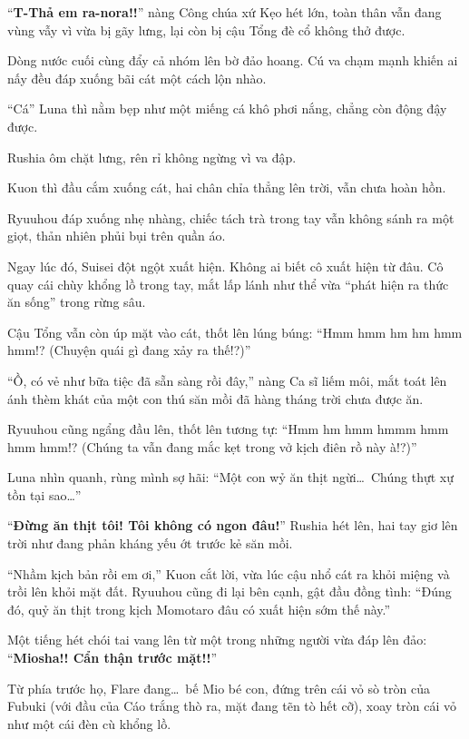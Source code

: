 \documentclass[../main.tex]{subfiles}
\begin{document}
``\textbf{T-Thả em ra-nora!!}'' nàng Công chúa xứ Kẹo hét lớn, toàn thân vẫn đang vùng vẫy vì vừa bị gãy lưng, lại còn bị cậu Tổng đè cổ không thở được.

Dòng nước cuối cùng đẩy cả nhóm lên bờ đảo hoang. Cú va chạm mạnh khiến ai nấy đều đáp xuống bãi cát một cách lộn nhào.

``Cá'' Luna thì nằm bẹp như một miếng cá khô phơi nắng, chẳng còn động đậy được.

Rushia ôm chặt lưng, rên rỉ không ngừng vì va đập.

Kuon thì đầu cắm xuống cát, hai chân chỉa thẳng lên trời, vẫn chưa hoàn hồn.

Ryuuhou đáp xuống nhẹ nhàng, chiếc tách trà trong tay vẫn không sánh ra một giọt, thản nhiên phủi bụi trên quần áo.


Ngay lúc đó, Suisei đột ngột xuất hiện. Không ai biết cô xuất hiện từ đâu. Cô quay cái chùy khổng lồ trong tay, mắt lấp lánh như thể vừa ``phát hiện ra thức ăn sống'' trong rừng sâu.

Cậu Tổng vẫn còn úp mặt vào cát, thốt lên lúng búng: ``Hmm hmm hm hm hmm hmm!? (Chuyện quái gì đang xảy ra thế!?)''

``Ồ, có vẻ như bữa tiệc đã sẵn sàng rồi đây,'' nàng Ca sĩ liếm môi, mắt toát lên ánh thèm khát của một con thú săn mồi đã hàng tháng trời chưa được ăn.

Ryuuhou cũng ngẩng đầu lên, thốt lên tương tự: ``Hmm hm hmm hmmm hmm hmm hmm!? (Chúng ta vẫn đang mắc kẹt trong vở kịch điên rồ này à!?)''

Luna nhìn quanh, rùng mình sợ hãi: ``Một con wỷ ăn thịt ngừi\dots\ Chúng thựt xự tồn tại sao\dots''

``\textbf{Đừng ăn thịt tôi! Tôi không có ngon đâu!}'' Rushia hét lên, hai tay giơ lên trời như đang phản kháng yếu ớt trước kẻ săn mồi.

``Nhầm kịch bản rồi em ơi,'' Kuon cắt lời, vừa lúc cậu nhổ cát ra khỏi miệng và trồi lên khỏi mặt đất. Ryuuhou cũng đi lại bên cạnh, gật đầu đồng tình: ``Đúng đó, quỷ ăn thịt trong kịch Momotaro đâu có xuất hiện sớm thế này.''

Một tiếng hét chói tai vang lên từ một trong những người vừa đáp lên đảo: ``\textbf{Miosha!! Cẩn thận trước mặt!!}''

Từ phía trước họ, Flare đang\dots\ bế Mio bé con, đứng trên cái vỏ sò tròn của Fubuki (với đầu của Cáo trắng thò ra, mặt đang tẽn tò hết cỡ), xoay tròn cái vỏ như một cái đèn cù khổng lồ.
\end{document}
